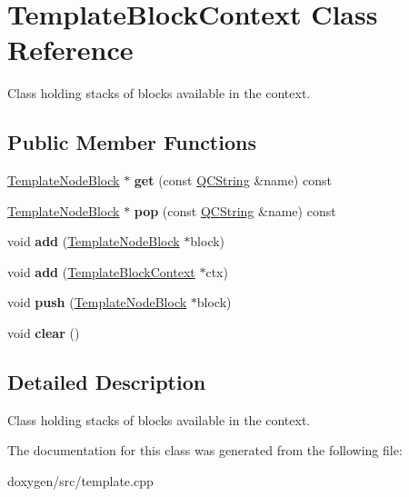 \hypertarget{class_template_block_context}{}\section{Template\+Block\+Context Class Reference}
\label{class_template_block_context}


Class holding stacks of blocks available in the context.  


\subsection*{Public Member Functions}
\begin{DoxyCompactItemize}
\item 
\mbox{\label{class_template_block_context_a938f6c4622d575954684af4a8b1d3b95}} 
\mbox{\hyperlink{class_template_node_block}{Template\+Node\+Block}} $\ast$ {\bfseries get} (const \mbox{\hyperlink{class_q_c_string}{Q\+C\+String}} \&name) const
\item 
\mbox{\label{class_template_block_context_a8e787804e30c1c5d8e8ca6280be30254}} 
\mbox{\hyperlink{class_template_node_block}{Template\+Node\+Block}} $\ast$ {\bfseries pop} (const \mbox{\hyperlink{class_q_c_string}{Q\+C\+String}} \&name) const
\item 
\mbox{\label{class_template_block_context_a3d0a08f3095d647312ccd6fce5b82f05}} 
void {\bfseries add} (\mbox{\hyperlink{class_template_node_block}{Template\+Node\+Block}} $\ast$block)
\item 
\mbox{\label{class_template_block_context_a7f02a241cdd46776132a518d1b09649d}} 
void {\bfseries add} (\mbox{\hyperlink{class_template_block_context}{Template\+Block\+Context}} $\ast$ctx)
\item 
\mbox{\label{class_template_block_context_a389d152f578bfdedac3175bcce274d60}} 
void {\bfseries push} (\mbox{\hyperlink{class_template_node_block}{Template\+Node\+Block}} $\ast$block)
\item 
\mbox{\label{class_template_block_context_aa0e65aff7bd42fcdb019b4ad6ebdd170}} 
void {\bfseries clear} ()
\end{DoxyCompactItemize}


\subsection{Detailed Description}
Class holding stacks of blocks available in the context. 

The documentation for this class was generated from the following file\+:\begin{DoxyCompactItemize}
\item 
doxygen/src/template.\+cpp\end{DoxyCompactItemize}
